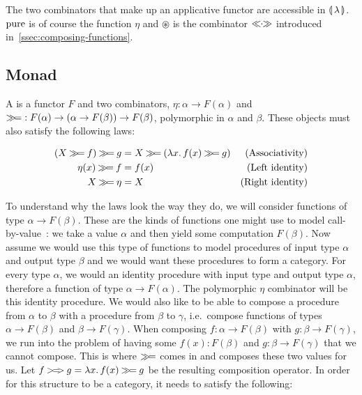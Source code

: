 The two combinators that make up an applicative functor are accessible in
$\llparenthesis \, \lambda \, \rrparenthesis$. $\operatorname{pure}$ is of course the function $\eta$ and $\circledast$ is
the combinator $\mathbin{\ll\!\!\cdot\!\!\gg}$ introduced in~\ref{ssec:composing-functions}.


\subsection{Monad}
\label{ssec:monad}

\begin{definition}
  A  is a functor $F$ and two combinators,
  $\eta : \alpha \to F(\alpha)$ and
  $\mathbin{\gg\!=} : F(\alpha) \to (\alpha \to F(\beta)) \to F(\beta)$, polymorphic
  in $\alpha$ and $\beta$. These objects must also satisfy the following
  laws:

  \begin{align}
    (X \mathbin{\gg\!=} f) \mathbin{\gg\!=} g &= X \mathbin{\gg\!=} (\lambda x.\, f(x) \mathbin{\gg\!=} g) & \text{(Associativity)} \\
    \eta(x) \mathbin{\gg\!=} f &= f(x) & \text{(Left identity)} \\
    X \mathbin{\gg\!=} \eta &= X & \text{(Right identity)}
  \end{align}
\end{definition}

To understand why the laws look the way they do, we will consider functions
of type $\alpha \to F(\beta)$. These are the kinds of functions one might
use to model call-by-value~\cite{moggi1991notions,moggi1990abstract}: we
take a value $\alpha$ and then yield some computation $F(\beta)$. Now
assume we would use this type of functions to model procedures of input
type $\alpha$ and output type $\beta$ and we would want these procedures to
form a category. For every type $\alpha$, we would an identity procedure
with input type and output type $\alpha$, therefore a function of type
$\alpha \to F(\alpha)$. The polymorphic $\eta$ combinator will be this
identity procedure. We would also like to be able to compose a procedure
from $\alpha$ to $\beta$ with a procedure from $\beta$ to $\gamma$, i.e.\
compose functions of types $\alpha \to F(\beta)$ and $\beta \to
F(\gamma)$. When composing $f : \alpha \to F(\beta)$ with
$g : \beta \to F(\gamma)$, we run into the problem of having some
$f(x) : F(\beta)$ and $g : \beta \to F(\gamma)$ that we cannot
compose. This is where $\mathbin{\gg\!=}$ comes in and composes these two values for
us. Let $f \mathbin{>\!=\!\!>} g = \lambda x.\, f(x) \mathbin{\gg\!=} g$ be the resulting
composition operator. In order for this structure to be a category, it
needs to satisfy the following:

